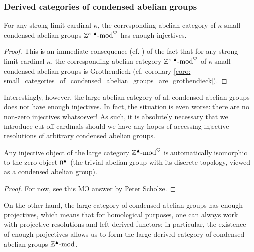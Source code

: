         \subsubsection{Derived categories of condensed abelian groups}
            \begin{proposition} \label{prop: small_categories_of_condensed_abelian_groups_have_enough_injectives}
                For any strong limit cardinal $\kappa$, the corresponding abelian category of $\kappa$-small condensed abelian groups $\mathbb{Z}^{\kappa\text{-}\blacktriangle}\text{-}\mathrm{mod}^{\heartsuit}$ has enough injectives. 
            \end{proposition}
                \begin{proof}
                    This is an immediate consequence (cf. \cite[Corollary 1.3.5.7]{HA}) of the fact that for any strong limit cardinal $\kappa$, the corresponding abelian category $\mathbb{Z}^{\kappa\text{-}\blacktriangle}\text{-}\mathrm{mod}^{\heartsuit}$ of $\kappa$-small condensed abelian groups is Grothendieck (cf. corollary \ref{coro: small_categories_of_condensed_abelian_groups_are_grothendieck}).
                \end{proof}
            Interestingly, however, the large abelian category of all condensed abelian groups does not have enough injectives. In fact, the situation is even worse: there are no non-zero injectives whatsoever! As such, it is absolutely necessary that we introduce cut-off cardinals should we have any hopes of accessing injective resolutions of arbitrary condensed abelian groups.
            \begin{proposition} \label{prop: injective_large_condensed_abelian_groups_are_trivial}
                Any injective object of the large category $\mathbb{Z}^{\blacktriangle}\text{-}\mathrm{mod}^{\heartsuit}$ is automatically isomorphic to the zero object $0^{\blacktriangle}$ (the trivial abelian group with its discrete topology, viewed as a condensed abelian group).
            \end{proposition}
                \begin{proof}
                    For now, see \href{https://mathoverflow.net/a/356261/143390}{\underline{this MO answer by Peter Scholze}}.
                \end{proof}
            On the other hand, the large category of condensed abelian groups has enough projectives, which means that for homological purposes, one can always work with projective resolutions and left-derived functors; in particular, the existence of enough projectives allows us to form the large derived category of condensed abelian groups $\mathbb{Z}^{\blacktriangle}\text{-}\mathrm{mod}$. 
